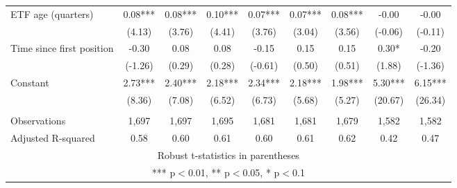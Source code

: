 \documentclass[]{article}
\begin{document}
\begin{tabular}{lcccccccc}
ETF age (quarters) & 0.08*** & 0.08*** & 0.10*** & 0.07*** & 0.07*** & 0.08*** & -0.00 & -0.00 \\
 & (4.13) & (3.76) & (4.41) & (3.76) & (3.04) & (3.56) & (-0.06) & (-0.11) \\
Time since first position & -0.30 & 0.08 & 0.08 & -0.15 & 0.15 & 0.15 & 0.30* & -0.20 \\
 & (-1.26) & (0.29) & (0.28) & (-0.61) & (0.50) & (0.51) & (1.88) & (-1.36) \\
Constant & 2.73*** & 2.40*** & 2.18*** & 2.34*** & 2.18*** & 1.98*** & 5.30*** & 6.15*** \\
 & (8.36) & (7.08) & (6.52) & (6.73) & (5.68) & (5.27) & (20.67) & (26.34) \\
 &  &  &  &  &  &  &  &  \\
Observations & 1,697 & 1,697 & 1,695 & 1,681 & 1,681 & 1,679 & 1,582 & 1,582 \\
 Adjusted R-squared & 0.58 & 0.60 & 0.61 & 0.60 & 0.61 & 0.62 & 0.42 & 0.47 \\ \hline
\multicolumn{9}{c}{ Robust t-statistics in parentheses} \\
\multicolumn{9}{c}{ *** p$<$0.01, ** p$<$0.05, * p$<$0.1} \\
\end{tabular}
\end{document}

